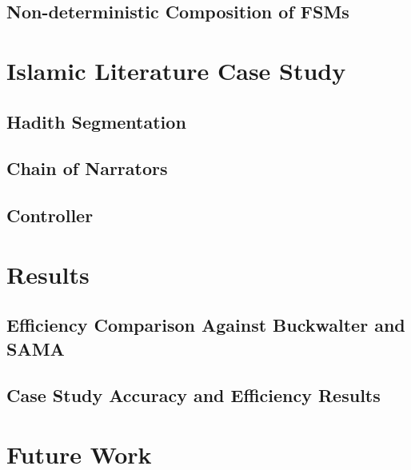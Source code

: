 \documentclass[11pt,letterpaper]{article}
\begin{document}
\subsection{Non-deterministic Composition of FSMs}

\section{Islamic Literature Case Study}

\subsection{Hadith Segmentation}

\subsection{Chain of Narrators} 

\subsection{Controller}


\section{Results}
\label{sec:results}

\subsection{Efficiency Comparison Against Buckwalter and SAMA}

\subsection{Case Study Accuracy and Efficiency Results}


\section{Future Work}


\end{document}
